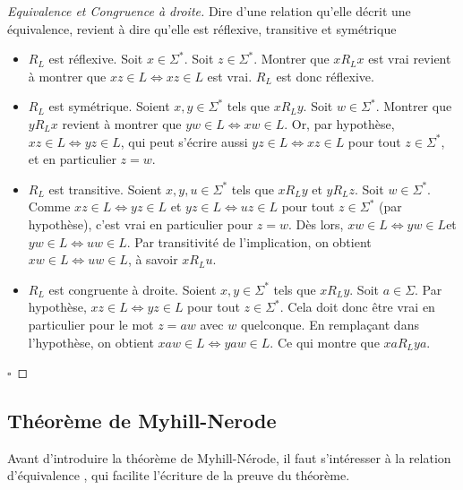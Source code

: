 \begin{proof}[Equivalence et Congruence à droite]
	Dire d'une relation qu'elle décrit une équivalence, revient à dire qu'elle est réflexive, transitive et symétrique
\begin{itemize}
		\item $R_L$ est réflexive. Soit $x \in \Sigma^*$. Soit $z \in \Sigma^*$. Montrer que $xR_Lx$ est vrai revient à montrer que $ xz \in L \Leftrightarrow xz \in L$ est vrai. $R_L$ est donc réflexive.
		\item $R_L$ est symétrique. Soient $x, y \in \Sigma^*$ tels que $xR_Ly$. Soit $w \in \Sigma^*$. Montrer que $yR_Lx$ revient à montrer que $ yw \in L \Leftrightarrow xw \in L$. Or, par hypothèse, $ xz \in L \Leftrightarrow yz \in L$, qui peut s'écrire aussi $ yz \in L \Leftrightarrow xz \in L$ pour tout $z \in \Sigma^*$, et en particulier $z=w$.
		\item $R_L$ est transitive. Soient $x,y,u \in \Sigma^*$ tels que $xR_Ly$ et $yR_Lz$. Soit $w \in \Sigma^*$. Comme $ xz \in L \Leftrightarrow yz \in L$ et $ yz \in L \Leftrightarrow uz \in L$ pour tout $z \in \Sigma^*$ (par hypothèse), c'est vrai en particulier pour $z=w$. Dès lors,  $ xw \in L \Leftrightarrow yw \in L$et $ yw \in L \Leftrightarrow uw \in L$. Par transitivité de l'implication, on obtient $ xw \in L \Leftrightarrow uw \in L$, à savoir $xR_Lu$.
		\item $R_L$ est congruente à droite. Soient $x,y \in \Sigma^*$ tels que $xR_Ly$. Soit $a \in \Sigma$. Par hypothèse, $ xz \in L \Leftrightarrow yz \in L$ pour tout $z \in \Sigma^*$. Cela doit donc être vrai en particulier pour le mot $z=aw$ avec $w$ quelconque. En remplaçant dans l'hypothèse, on obtient  $ xaw \in L \Leftrightarrow yaw \in L$. Ce qui montre que $xaR_Lya$.
	\end{itemize}

\hfill$\square$
\end{proof}


\subsection{Théorème de Myhill-Nerode}

	Avant d'introduire la théorème de Myhill-Nérode, il faut s'intéresser à la relation d'équivalence \rb, qui facilite l'écriture de la preuve du théorème.

